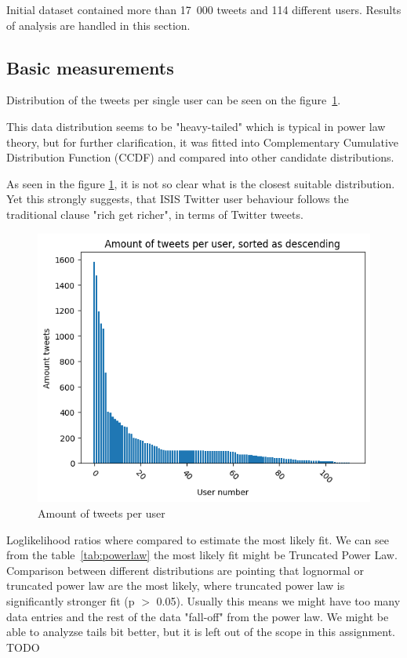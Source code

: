 \documentclass[conference]{IEEEtran}
\begin{document}
Initial dataset contained more than 17~000 tweets and 114 different users.
Results of analysis are handled in this section.

\subsection{Basic measurements}

Distribution of the tweets per single user can be seen on the figure~\ref{fig:amount-tweets-user}.

This data distribution seems to be "heavy-tailed" which is typical in power law theory, but for further clarification,
it was fitted into Complementary Cumulative Distribution Function (CCDF) and compared into other candidate distributions.

As seen in the figure \ref{fig:amount-tweets-user}, it is not so clear what is the closest suitable distribution.
Yet this strongly suggests, that ISIS Twitter user behaviour follows the traditional clause "rich get richer", in terms of Twitter tweets.

\begin{figure}
    \includegraphics[scale=0.6]{figures/amount_tweets_per_user}
     \caption{Amount of tweets per user}
    \label{fig:amount-tweets-user}
\end{figure}

Loglikelihood ratios where compared to estimate the most likely fit.
We can see from the table~\ref{tab:powerlaw} the most likely fit might be Truncated Power Law.
Comparison between different distributions are pointing that lognormal or truncated power law are the most likely, where truncated power law is significantly stronger fit (p $>$ 0.05).
Usually this means we might have too many data entries and the rest of the data "fall-off" from the power law.
We might be able to analyzse tails bit better, but it is left out of the scope in this assignment.
TODO
\end{document}
